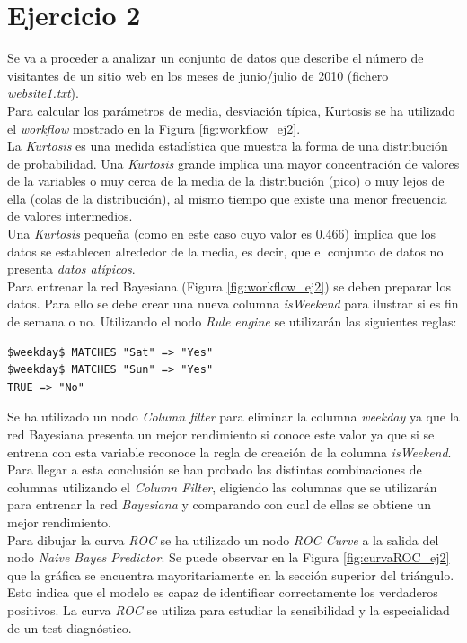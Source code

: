 \documentclass[10pt,a4paper]{article}
\begin{document}
\section{Ejercicio 2}

Se va a proceder a analizar un conjunto de datos que describe el número de visitantes de un sitio web en los meses de junio/julio de 2010 (fichero \emph{website1.txt}).\\

Para calcular los parámetros de media, desviación típica, Kurtosis se ha utilizado el \emph{workflow} mostrado en la Figura \ref{fig:workflow_ej2}.\\
La \emph{Kurtosis} es una medida estadística que muestra la forma de una distribución de probabilidad. Una \emph{Kurtosis} grande implica una mayor concentración de valores de la variables o muy cerca de la media de la distribución (pico) o muy lejos de ella (colas de la distribución), al mismo tiempo que existe una menor frecuencia de valores intermedios.\\
Una \emph{Kurtosis} pequeña (como en este caso cuyo valor es 0.466) implica que los datos se establecen alrededor de la media, es decir, que el conjunto de datos no presenta \emph{datos atípicos}.\\

Para entrenar la red Bayesiana (Figura \ref{fig:workflow_ej2}) se deben preparar los datos. Para ello se debe crear una nueva columna \emph{isWeekend} para ilustrar si es fin de semana o no. Utilizando el nodo \emph{Rule engine} se utilizarán las siguientes reglas:

\begin{lstlisting}
$weekday$ MATCHES "Sat" => "Yes"
$weekday$ MATCHES "Sun" => "Yes"
TRUE => "No"
\end{lstlisting}

Se ha utilizado un nodo \emph{Column filter} para eliminar la columna \emph{weekday} ya que la red Bayesiana presenta un mejor rendimiento si conoce este valor ya que si se entrena con esta variable reconoce la regla de creación de la columna \emph{isWeekend}.\\
Para llegar a esta conclusión se han probado las distintas combinaciones de columnas utilizando el \emph{Column Filter}, eligiendo las columnas que se utilizarán para entrenar la red \emph{Bayesiana} y comparando con cual de ellas se obtiene un mejor rendimiento.\\

Para dibujar la curva \emph{ROC} se ha utilizado un nodo \emph{ROC Curve} a la salida del nodo \emph{Naive Bayes Predictor}. Se puede observar en la Figura \ref{fig:curvaROC_ej2} que la gráfica se encuentra mayoritariamente en la sección superior del triángulo. Esto indica que el modelo es capaz de identificar correctamente los verdaderos positivos. La curva \emph{ROC} se utiliza para estudiar la sensibilidad y la especialidad de un test diagnóstico.\\
\end{document}
